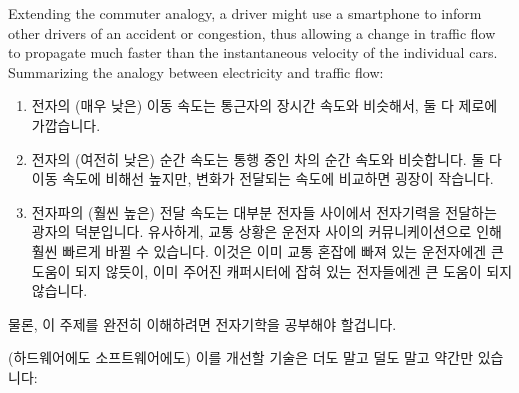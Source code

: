 {	Extending the commuter analogy, a driver might use a smartphone
	to inform other drivers of an accident or congestion, thus
	allowing a change in traffic flow to propagate much faster
	than the instantaneous velocity of the individual cars.
	Summarizing the analogy between electricity and traffic flow:
	\fi

	\begin{enumerate}
	\item	전자의 (매우 낮은) 이동 속도는 통근자의 장시간 속도와 비슷해서,
		둘 다 제로에 가깝습니다.
	\item	전자의 (여전히 낮은) 순간 속도는 통행 중인 차의 순간 속도와 비슷합니다.
		둘 다 이동 속도에 비해선 높지만, 변화가 전달되는 속도에 비교하면 굉장이 작습니다.
	\item	전자파의 (훨씬 높은) 전달 속도는 대부분 전자들 사이에서
		전자기력을 전달하는 광자의 덕분입니다.
		유사하게, 교통 상황은 운전자 사이의 커뮤니케이션으로 인해 훨씬
		빠르게 바뀔 수 있습니다.
		이것은 이미 교통 혼잡에 빠져 있는 운전자에겐 큰 도움이 되지
		않듯이, 이미 주어진 캐퍼시터에 잡혀 있는 전자들에겐 큰 도움이
		되지 않습니다.
	\end{enumerate}

	\iffalse
	\begin{enumerate}
	\item	The (very low) drift velocity of an electron is similar
		to the long-term velocity of a commuter, both being
		very nearly zero.
	\item	The (still rather low) instantaneous velocity of
		an electron is similar to the instantaneous velocity
		of a car in traffic.
		Both are much higher than the drift velocity, but
		quite small compared to the rate at which changes
		propagate.
	\item	The (much higher) propagation velocity of an electric
		wave is primarily due to photons transmitting
		electromagnetic force among the electrons.
		Similarly, traffic patterns can change quite quickly
		due to communication among drivers.
		Not that this is necessarily of much help to the
		drivers already stuck in traffic, any more than it
		is to the electrons already pooled in a given capacitor.
	\end{enumerate}
	\fi

	물론, 이 주제를 완전히 이해하려면 전자기학을 공부해야 할겁니다.

	\iffalse
	Of course, to fully understand this topic, you should read
	up on electrodynamics.
	\fi
} \QuickQuizEnd

(하드웨어에도 소프트웨어에도) 이를 개선할 기술은 더도 말고 덜도 말고 약간만 있습니다:


